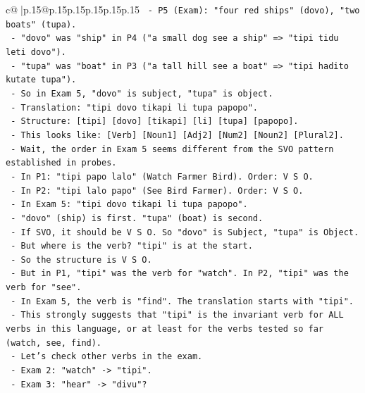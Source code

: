 \documentclass{article}
\begin{document}
{\begin{supertabular}{c@{$\;$}|p{.15\linewidth}@{}p{.15\linewidth}p{.15\linewidth}p{.15\linewidth}p{.15\linewidth}p{.15\linewidth}}
{{{\texttt{      {-} P5 (Exam): "four red ships" (dovo), "two boats" (tupa).} \\
\texttt{        {-} "dovo" was "ship" in P4 ("a small dog see a ship" => "tipi tidu leti dovo").} \\
\texttt{        {-} "tupa" was "boat" in P3 ("a tall hill see a boat" => "tipi hadito kutate tupa").} \\
\texttt{        {-} So in Exam 5, "dovo" is subject, "tupa" is object.} \\
\texttt{        {-} Translation: "tipi dovo tikapi li tupa papopo".} \\
\texttt{        {-} Structure: {[}tipi{]} {[}dovo{]} {[}tikapi{]} {[}li{]} {[}tupa{]} {[}papopo{]}.} \\
\texttt{        {-} This looks like: {[}Verb{]} {[}Noun1{]} {[}Adj2{]} {[}Num2{]} {[}Noun2{]} {[}Plural2{]}.} \\
\texttt{        {-} Wait, the order in Exam 5 seems different from the SVO pattern established in probes.} \\
\texttt{        {-} In P1: "tipi papo lalo" (Watch Farmer Bird). Order: V S O.} \\
\texttt{        {-} In P2: "tipi lalo papo" (See Bird Farmer). Order: V S O.} \\
\texttt{        {-} In Exam 5: "tipi dovo tikapi li tupa papopo".} \\
\texttt{          {-} "dovo" (ship) is first. "tupa" (boat) is second.} \\
\texttt{          {-} If SVO, it should be V S O. So "dovo" is Subject, "tupa" is Object.} \\
\texttt{          {-} But where is the verb? "tipi" is at the start.} \\
\texttt{          {-} So the structure is V S O.} \\
\texttt{          {-} But in P1, "tipi" was the verb for "watch". In P2, "tipi" was the verb for "see".} \\
\texttt{          {-} In Exam 5, the verb is "find". The translation starts with "tipi".} \\
\texttt{          {-} This strongly suggests that "tipi" is the invariant verb for ALL verbs in this language, or at least for the verbs tested so far (watch, see, find).} \\
\texttt{          {-} Let's check other verbs in the exam.} \\
\texttt{          {-} Exam 2: "watch" {-}> "tipi".} \\
\texttt{          {-} Exam 3: "hear" {-}> "divu"?} \\
}}}
\end{supertabular}}
\end{document}
